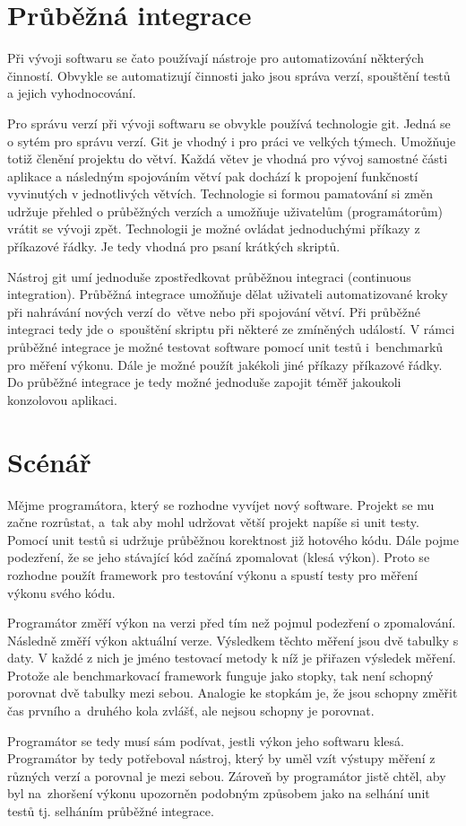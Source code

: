 \section{Průběžná integrace}
Při vývoji softwaru se čato používají nástroje pro automatizování některých činností.
Obvykle se automatizují činnosti jako jsou správa verzí, spouštění testů a jejich vyhodnocování.

Pro správu verzí při vývoji softwaru se obvykle používá technologie git.
Jedná se o sytém pro správu verzí. Git je vhodný i pro práci ve velkých týmech.
Umožňuje totiž členění projektu do větví. Každá větev je vhodná pro vývoj samostné části aplikace
a následným spojováním větví pak dochází k propojení funkčností vyvinutých v jednotlivých větvích.
Technologie si formou pamatování si změn udržuje přehled o průběžných verzích a umožňuje uživatelům (programátorům)
vrátit se vývoji zpět. Technologii je možné ovládat jednoduchými příkazy z příkazové řádky.
Je tedy vhodná pro psaní krátkých skriptů.

Nástroj git umí jednoduše zpostředkovat průběžnou integraci (continuous integration). Průběžná integrace umožňuje dělat uživateli automatizované
kroky při nahrávání nových verzí do~větve nebo při spojování větví. Při průběžné integraci tedy jde o~spouštění
skriptu při některé ze zmíněných událostí. V rámci průběžné integrace je možné testovat software pomocí unit testů
i~benchmarků pro měření výkonu. Dále je možné použít jakékoli jiné příkazy příkazové řádky.
Do průběžné integrace je tedy možné jednoduše zapojit téměř jakoukoli konzolovou aplikaci.

\section{Scénář}
Mějme programátora, který se rozhodne vyvíjet nový software. Projekt se mu začne rozrůstat, a~tak
aby mohl udržovat větší projekt napíše si unit testy. Pomocí unit testů si udržuje průběžnou korektnost
již hotového kódu. Dále pojme podezření, že se jeho stávající kód začíná zpomalovat (klesá výkon). Proto se
rozhodne použít framework pro testování výkonu a spustí testy pro měření výkonu svého kódu.

Programátor změří výkon na verzi před tím než pojmul podezření o zpomalování. Následně změří výkon aktuální verze.
Výsledkem těchto měření jsou dvě tabulky s daty. V každé z nich je jméno testovací metody k níž je přiřazen výsledek
měření. Protože ale benchmarkovací framework funguje jako stopky, tak není schopný porovnat dvě tabulky mezi sebou.
Analogie ke stopkám je, že jsou schopny změřit čas prvního a~druhého kola zvlášť, ale nejsou schopny je porovnat.

Programátor se tedy musí sám podívat, jestli výkon jeho softwaru klesá. Programátor by tedy potřeboval
nástroj, který by uměl vzít výstupy měření z různých verzí a porovnal je mezi sebou. Zároveň by programátor jistě
chtěl, aby byl na~zhoršení výkonu upozorněn podobným způsobem jako na selhání unit testů tj. selháním
průběžné integrace.
